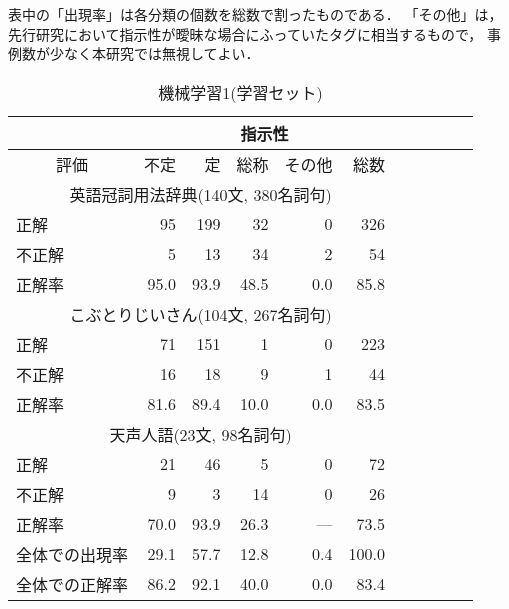 表中の「出現率」は各分類の個数を総数で割ったものである．
「その他」は，
先行研究において指示性が曖昧な場合にふっていたタグに相当するもので，
事例数が少なく本研究では無視してよい．

\begin{table}[t]
\small

\caption{機械学習1(学習セット)}\label{tab:kanshi_m1}

\begin{center}


{

\begin{tabular}[c]{|l|r|r|r|r|r|r|r|r|r|r|} \hline
 & \multicolumn{5}{c|}{指示性}   \\ \hline 
\multicolumn{1}{|c|}{評価}  &  不定  &  定 &  総称 &  その他 & 総数 \\\hline
\multicolumn{6}{|c|}{英語冠詞用法辞典(140文, 380名詞句)} \\ \hline 
   正解   &      95  &     199  &      32  &       0  &     326   \\
  不正解  &       5  &      13  &      34  &       2  &      54   \\\hline
  正解率  &   95.0  &   93.9  &   48.5  &    0.0  &   85.8   \\\hline
\multicolumn{6}{|c|}{こぶとりじいさん(104文, 267名詞句)} \\\hline 
   正解   &      71  &     151  &       1  &       0  &     223   \\
  不正解  &      16  &      18  &       9  &       1  &      44   \\\hline
  正解率  &   81.6  &   89.4  &   10.0  &    0.0  &   83.5   \\\hline
\multicolumn{6}{|c|}{天声人語(23文, 98名詞句)} \\ \hline 
   正解   &      21  &      46  &       5  &       0  &      72   \\
  不正解  &       9  &       3  &      14  &       0  &      26   \\\hline
  正解率  &   70.0  &   93.9  &   26.3  &     ---  &   73.5   \\\hline
全体での出現率 &  29.1  &  57.7   &  12.8   &  0.4  &  100.0   \\
全体での正解率  &   86.2  &   92.1  &   40.0  &    0.0  &   83.4   \\\hline
\end{tabular}
}
\end{center}
\end{table}

